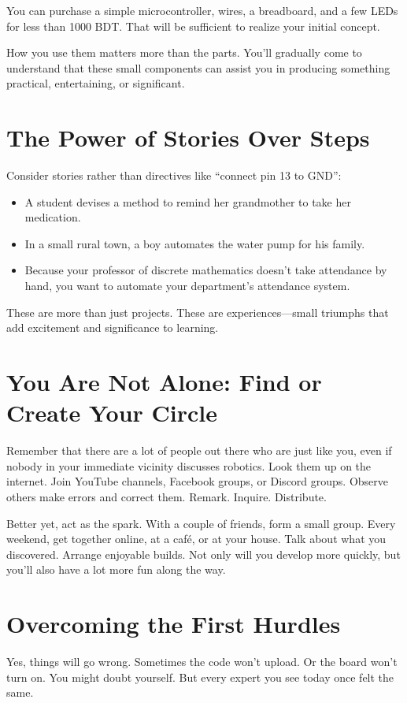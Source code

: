 \documentclass[a4paper,10pt,twocolumn]{memoir}
\begin{document}
You can purchase a simple microcontroller, wires, a breadboard, and a few LEDs for less than 1000 BDT. That will be sufficient to realize your initial concept.

How you use them matters more than the parts. You’ll gradually come to understand that these small components can assist you in producing something practical, entertaining, or significant.
\section*{The Power of Stories Over Steps}
Consider stories rather than directives like ``connect pin 13 to GND'':
\begin{itemize}
    \item A student devises a method to remind her grandmother to take her medication.
    \item In a small rural town, a boy automates the water pump for his family.
    \item Because your professor of discrete mathematics doesn’t take attendance by hand, you want to automate your department’s attendance system.
\end{itemize}
These are more than just projects. These are experiences—small triumphs that add excitement and significance to learning.
\section*{You Are Not Alone: Find or Create Your Circle}
Remember that there are a lot of people out there who are just like you, even if nobody in your immediate vicinity discusses robotics. Look them up on the internet. Join YouTube channels, Facebook groups, or Discord groups. Observe others make errors and correct them. Remark. Inquire. Distribute.

Better yet, act as the spark. With a couple of friends, form a small group. Every weekend, get together online, at a café, or at your house. Talk about what you discovered. Arrange enjoyable builds. Not only will you develop more quickly, but you’ll also have a lot more fun along the way.
\section*{Overcoming the First Hurdles}
Yes, things will go wrong. Sometimes the code won’t upload. Or the board won’t turn on. You might doubt yourself. But every expert you see today once felt the same.
\end{document}
